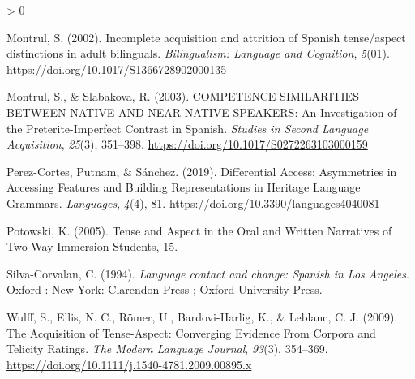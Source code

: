 \documentclass[
  english,
  man,floatsintext]{apa6}
\newlength{\cslhangindent}
\newenvironment{CSLReferences}[2] %
 {%
  \setlength{\parindent}{0pt}
  \ifodd #1 \everypar{\setlength{\hangindent}{\cslhangindent}}\ignorespaces\fi
  \ifnum #2 > 0
  \setlength{\parskip}{#2\baselineskip}
  \fi
 }%
 {}
\begin{document}
\begin{CSLReferences}{1}{0}
\leavevmode\hypertarget{ref-montrul_incomplete_2002}{}%
Montrul, S. (2002). Incomplete acquisition and attrition of {Spanish} tense/aspect distinctions in adult bilinguals. \emph{Bilingualism: Language and Cognition}, \emph{5}(01). \url{https://doi.org/10.1017/S1366728902000135}

\leavevmode\hypertarget{ref-montrul_competence_2003}{}%
Montrul, S., \& Slabakova, R. (2003). {COMPETENCE} {SIMILARITIES} {BETWEEN} {NATIVE} {AND} {NEAR}-{NATIVE} {SPEAKERS}: {An} {Investigation} of the {Preterite}-{Imperfect} {Contrast} in {Spanish}. \emph{Studies in Second Language Acquisition}, \emph{25}(3), 351--398. \url{https://doi.org/10.1017/S0272263103000159}

\leavevmode\hypertarget{ref-perez-cortes_differential_2019}{}%
Perez-Cortes, Putnam, \& Sánchez. (2019). Differential {Access}: {Asymmetries} in {Accessing} {Features} and {Building} {Representations} in {Heritage} {Language} {Grammars}. \emph{Languages}, \emph{4}(4), 81. \url{https://doi.org/10.3390/languages4040081}

\leavevmode\hypertarget{ref-potowski_tense_2005}{}%
Potowski, K. (2005). Tense and {Aspect} in the {Oral} and {Written} {Narratives} of {Two}-{Way} {Immersion} {Students}, 15.

\leavevmode\hypertarget{ref-silva-corvalan_language_1994}{}%
Silva-Corvalan, C. (1994). \emph{Language contact and change: {Spanish} in {Los} {Angeles}}. Oxford : New York: Clarendon Press ; Oxford University Press.

\leavevmode\hypertarget{ref-wulff_acquisition_2009}{}%
Wulff, S., Ellis, N. C., Römer, U., Bardovi-Harlig, K., \& Leblanc, C. J. (2009). The {Acquisition} of {Tense}-{Aspect}: {Converging} {Evidence} {From} {Corpora} and {Telicity} {Ratings}. \emph{The Modern Language Journal}, \emph{93}(3), 354--369. \url{https://doi.org/10.1111/j.1540-4781.2009.00895.x}

\end{CSLReferences}
\end{document}
